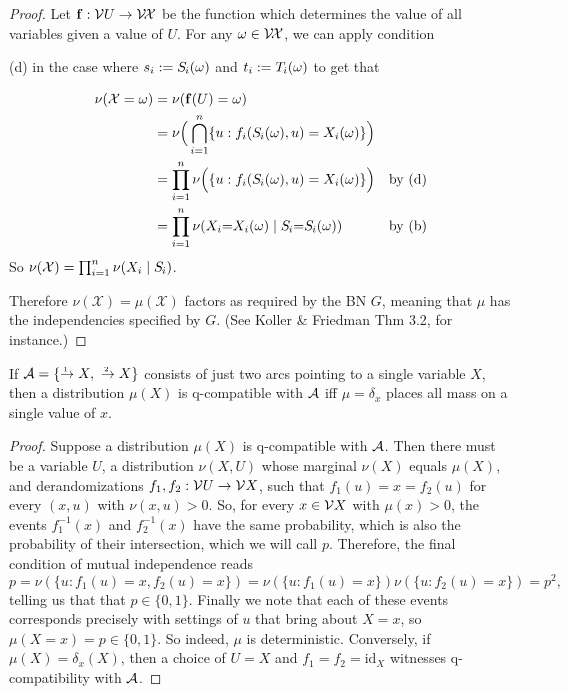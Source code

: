 \documentclass{article}
\newcommand{\X}{\mathcal X}
\begin{document}
\begin{proof}
    Let $\mat f: \V U \to \V \!\X$ be the function which determines the value of all variables given a value of $U$.
    For any $\omega \in \V\!\X$, we can apply condition

    (d) in the case where $s_i := \Src i(\omega)$ and $t_i := \Tgt i(\omega)$ to get that

    \begin{align*}
        \nu(\X = \omega)
        &= \nu(\mat f(U) = \omega)  \\
        &= \nu\Big( \bigcap_{i=1}^n \{ u : f_i(\Src i(\omega), u) = X_i(\omega) \} \Big)\\
        &= \prod_{i = 1}^n \nu\Big(\{ u : f_i(\Src i(\omega), u) = X_i(\omega) \} \Big)
            &\text{by (d)}\\
        &= \prod_{i = 1}^n \nu(X_i{=}X_i(\omega) \mid \Src i {=} \Src i(\omega))
            &\text{by (b)}
    \end{align*}
    So  $\nu(\X) = \prod_{i=1}^n \nu(X_i \mid \Src i)$.


    Therefore $\nu(\X) = \mu(\X)$ factors as required by the BN $G$, meaning that $\mu$ has the independencies specified by $G$. (See Koller \& Friedman Thm 3.2, for instance.)
\end{proof}



\begin{prop} %
    If $\Ar = \{ \ed1{}X, ~ \ed2{}X \}$ consists of just two arcs pointing to a single variable $X$,
    then a distribution $\mu(X)$ is q-compatible with $\mathcal A$ iff $\mu = \delta_x$ places all mass on a single value of $x$.
\end{prop}
\begin{proof}
    Suppose a distribution $\mu(X)$ is q-compatible with $\mathcal A$. Then there must be a variable $U$, a distribution $\nu(X,U)$ whose marginal $\nu(X)$ equals $\mu(X)$, and derandomizations $f_1, f_2 : \mathcal V U \to \mathcal V X$, such that $f_1(u) = x = f_2(u)$ for every $(x,u)$ with $\nu(x,u) > 0$.
    So, for every $x \in \mathcal V X$ with $\mu(x) > 0$, the events $f^{-1}_1(x)$ and $f_2^{-1}(x)$ have the same probability, which is also the probability of their intersection, which we will call $p$.
    Therefore, the final condition of mutual independence reads
    \[
        p = \nu(\{ u : f_1(u) {=} x, f_2(u) {=} x\}) = \nu(\{u : f_1(u) {=} x\})\nu(\{u : f_2(u) {=} x\}) = p^2,
    \]
    telling us that that $p \in \{0,1\}$. Finally we note that each of these events corresponds precisely with settings of $u$ that bring about $X=x$, so $\mu(X{=}x) = p \in \{0,1\}$. So indeed, $\mu$ is deterministic.
    Conversely, if $\mu(X) = \delta_x(X)$, then a choice of $U = X$ and $f_1 = f_2 = \mathrm{id}_X$ witnesses q-compatibility with $\mathcal A$.
\end{proof}
\end{document}
